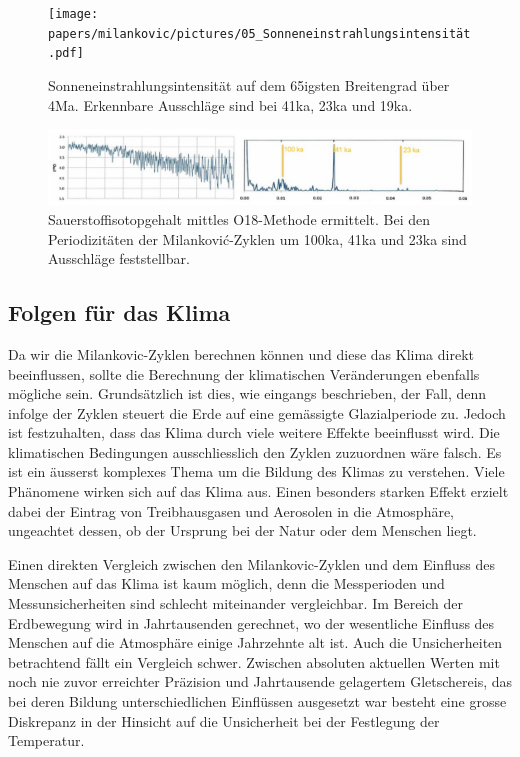 \begin{figure}
	\centering
	\texttt{[image: papers/milankovic/pictures/05\_Sonneneinstrahlungsintensität.pdf]}
	\caption{Sonneneinstrahlungsintensität auf dem 65igsten Breitengrad über 4Ma.
	Erkennbare Ausschläge sind bei 41ka, 23ka und 19ka.
		\label{pictureUntersuchungSonneneinstrahlungsintensität}}
\end{figure}
\begin{figure}
	\centering
	\includegraphics[width=\linewidth]{papers/milankovic/pictures/06_O18-Konzentration.pdf}
	\caption{Sauerstoffisotopgehalt mittles O18-Methode ermittelt.
	Bei den Periodizitäten der Milankovi\'c-Zyklen um 100ka, 41ka und 23ka sind Ausschläge feststellbar. 
		\label{pictureUntersuchungKonzentration}}
\end{figure}

\subsection{Folgen für das Klima
	\label{milankovic:subsection:FolgenKlima}}
Da wir die Milankovic-Zyklen berechnen können und diese das Klima direkt beeinflussen, sollte die Berechnung der klimatischen Veränderungen ebenfalls mögliche sein.
Grundsätzlich ist dies, wie eingangs beschrieben, der Fall, denn infolge der Zyklen steuert die Erde auf eine gemässigte Glazialperiode zu.
Jedoch ist festzuhalten, dass das Klima durch viele weitere Effekte beeinflusst wird.
Die klimatischen Bedingungen ausschliesslich den Zyklen zuzuordnen wäre falsch.
Es ist ein äusserst komplexes Thema um die Bildung des Klimas zu verstehen.
Viele Phänomene wirken sich auf das Klima aus.
Einen besonders starken Effekt erzielt dabei der Eintrag von Treibhausgasen und Aerosolen in die Atmosphäre, ungeachtet dessen, ob der Ursprung bei der Natur oder dem Menschen liegt.

Einen direkten Vergleich zwischen den Milankovic-Zyklen und dem Einfluss des Menschen auf das Klima ist kaum möglich, denn die Messperioden und Messunsicherheiten sind schlecht miteinander vergleichbar.
Im Bereich der Erdbewegung wird in Jahrtausenden gerechnet, wo der wesentliche Einfluss des Menschen auf die Atmosphäre einige Jahrzehnte alt ist.
Auch die Unsicherheiten betrachtend fällt ein Vergleich schwer.
Zwischen absoluten aktuellen Werten mit noch nie zuvor erreichter Präzision und Jahrtausende gelagertem Gletschereis, das bei deren Bildung unterschiedlichen Einflüssen ausgesetzt war besteht eine grosse Diskrepanz in der Hinsicht auf die Unsicherheit bei der Festlegung der Temperatur.





